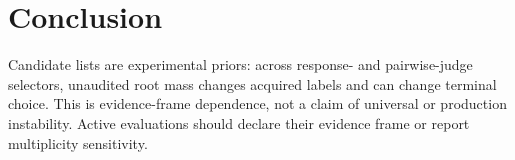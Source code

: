 \section{Conclusion}
Candidate lists are experimental priors: across response- and pairwise-judge selectors, unaudited root mass changes acquired labels and can change terminal choice. This is evidence-frame dependence, not a claim of universal or production instability. Active evaluations should declare their evidence frame or report multiplicity sensitivity.

